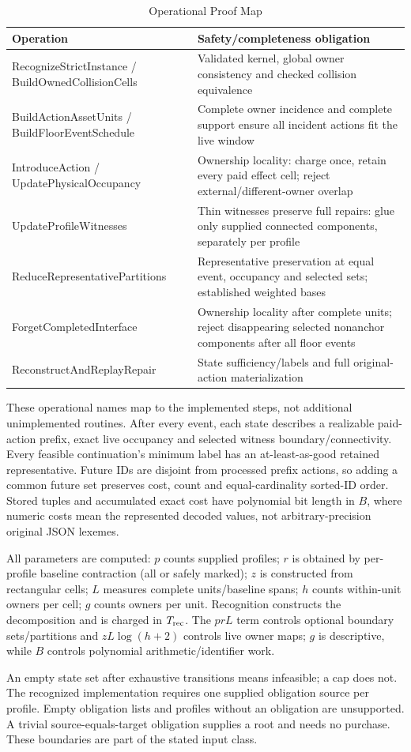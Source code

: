 \begin{table}[t]
\caption{Operational Proof Map}\label{tab:proofmap}
\centering\footnotesize\begin{tabular}{p{}p{}}
\toprule Operation & Safety/completeness obligation \\\midrule
RecognizeStrictInstance / BuildOwnedCollisionCells & Validated kernel, global owner consistency and checked collision equivalence\\
BuildActionAssetUnits / BuildFloorEventSchedule & Complete owner incidence and complete support ensure all incident actions fit the live window\\
IntroduceAction / UpdatePhysicalOccupancy & Ownership locality: charge once, retain every paid effect cell; reject external/different-owner overlap\\
UpdateProfileWitnesses & Thin witnesses preserve full repairs: glue only supplied connected components, separately per profile\\
ReduceRepresentativePartitions & Representative preservation at equal event, occupancy and selected sets; established weighted bases\\
ForgetCompletedInterface & Ownership locality after complete units; reject disappearing selected nonanchor components after all floor events\\
ReconstructAndReplayRepair & State sufficiency/labels and full original-action materialization\\
\bottomrule\end{tabular}\end{table}
These operational names map to the implemented steps, not additional unimplemented routines. After every event, each state describes a realizable paid-action prefix, exact live occupancy and selected witness boundary/connectivity. Every feasible continuation's minimum label has an at-least-as-good retained representative. Future IDs are disjoint from processed prefix actions, so adding a common future set preserves cost, count and equal-cardinality sorted-ID order. Stored tuples and accumulated exact cost have polynomial bit length in $B$, where numeric costs mean the represented decoded values, not arbitrary-precision original JSON lexemes.

All parameters are computed: $p$ counts supplied profiles; $r$ is obtained by per-profile baseline contraction (all or safely marked); $z$ is constructed from rectangular cells; $L$ measures complete units/baseline spans; $h$ counts within-unit owners per cell; $g$ counts owners per unit. Recognition constructs the decomposition and is charged in $T_{\rm rec}$. The $prL$ term controls optional boundary sets/partitions and $zL\log(h+2)$ controls live owner maps; $g$ is descriptive, while $B$ controls polynomial arithmetic/identifier work.

An empty state set after exhaustive transitions means infeasible; a cap does not. The recognized implementation requires one supplied obligation source per profile. Empty obligation lists and profiles without an obligation are unsupported. A trivial source-equals-target obligation supplies a root and needs no purchase. These boundaries are part of the stated input class.
